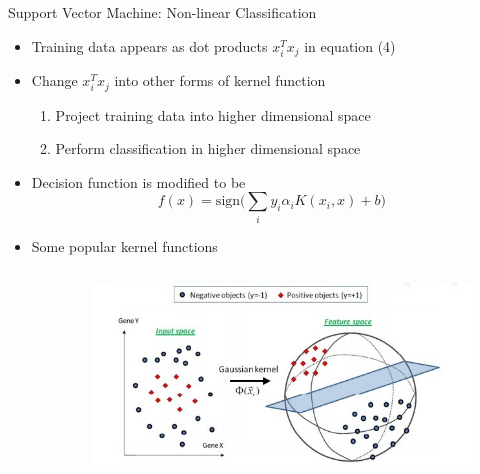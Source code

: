 \begin{frame}{Support Vector Machine: Non-linear Classification}

	\begin{itemize}
	\item Training data appears as dot products $x_i^T x_j$ in equation (4)
	\item Change $x_i^T x_j$ into other forms of kernel function
		\begin{enumerate}
			\item Project training data into higher dimensional space
			\item Perform classification in higher dimensional space
		\end{enumerate}
	\item Decision function is modified to be 
		  \begin{equation}
		  f(x) = \text{sign}\bigg(\sum_i y_i \alpha_i K(x_i,x) + b\bigg)
		  \end{equation}
	\item Some popular kernel functions \begin{columns}
			    \begin{table}[!ht]
			        \begin{center}
			        \end{center}
			        \caption{Kernel functions}
			    \end{table}

			\begin{figure}[!ht]
				\centering
				\includegraphics[scale=0.4]{./rbf.jpg}
			\end{figure}
	\end{columns}
	\end{itemize}
\end{frame}


